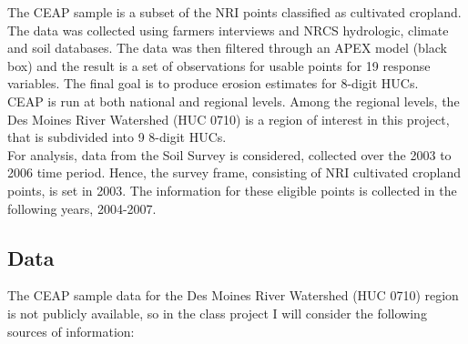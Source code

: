 \documentclass{article}\usepackage[]{graphicx}\usepackage[]{color}
\begin{document}
The CEAP sample is a subset of the NRI points classified as cultivated cropland. The data was collected using farmers interviews and NRCS hydrologic, climate and soil databases. The data was then filtered through an APEX model (black box) and the result is a set of observations for usable points for 19 response variables. The final goal is to produce erosion estimates for 8-digit HUCs. \\

CEAP is run at both national and regional levels. Among the regional levels, the Des Moines River Watershed (HUC 0710) is a region of interest in this project, that is subdivided into 9 8-digit HUCs.\\

For analysis, data from the Soil Survey is considered, collected over the 2003 to 2006 time period. Hence, the survey frame, consisting of NRI cultivated cropland points, is set in 2003. The information for these eligible points is collected in the following years, 2004-2007.


\subsection{Data}

The CEAP sample data for the Des Moines River Watershed (HUC 0710) region is not publicly available, so in the class project I will consider the following sources of information:
\end{document}
